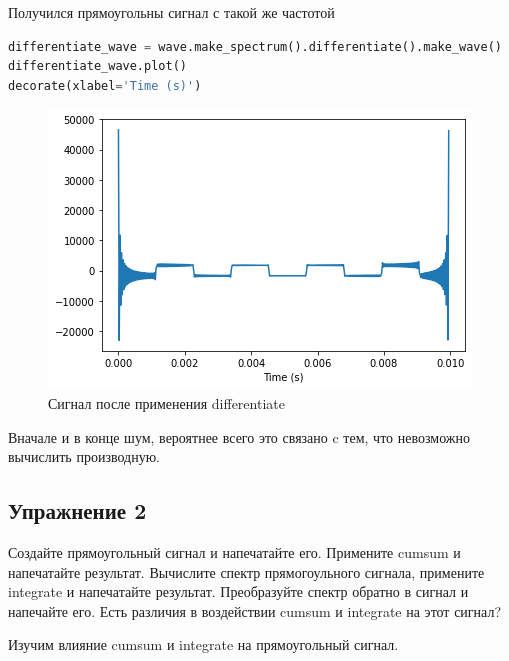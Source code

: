 Получился прямоугольны сигнал с такой же частотой

\begin{lstlisting}[language=Python]
differentiate_wave = wave.make_spectrum().differentiate().make_wave()
differentiate_wave.plot()
decorate(xlabel='Time (s)')
\end{lstlisting}
\begin{figure}[H]
	\begin{center}
		\includegraphics[scale=1]{fig/lab09/lab09_3.png}
		\caption{Сигнал после применения differentiate}
	\end{center}
\end{figure}

Вначале и в конце шум, вероятнее всего это связано c тем, что невозможно вычислить производную.

\subsection{Упражнение 2}

Создайте прямоугольный сигнал и напечатайте его. Примените cumsum и напечатайте результат. Вычислите спектр прямогоульного сигнала, примените integrate и напечатайте результат. Преобразуйте спектр обратно в сигнал и напечайте его. Есть различия в воздействии cumsum и integrate на этот сигнал?

Изучим влияние cumsum и integrate на прямоугольный сигнал.

